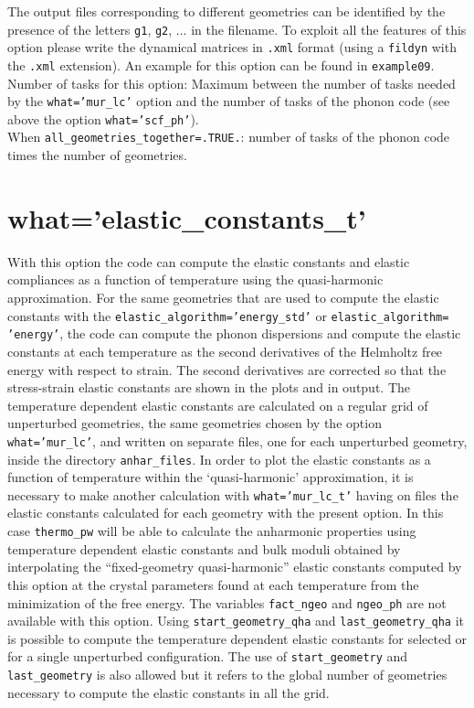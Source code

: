 \documentclass[12pt,a4paper,twoside]{report}
\begin{document}
The output files corresponding to different geometries can be identified
by the presence of the letters \texttt{g1}, \texttt{g2}, ... in the filename.
To exploit all the features of this option please write the dynamical matrices
in \texttt{.xml} format (using a \texttt{fildyn} with the \texttt{.xml}
extension).
An example for this option can be found in \texttt{example09}. \\
Number of tasks for this option: Maximum between the number of tasks  
needed by the \texttt{what='mur\_lc'} option and the number
of tasks of the phonon code (see above the option \texttt{what='scf\_ph'}). \\
When \texttt{all\_geometries\_together=.TRUE.}: number of tasks of the
phonon code times the number of geometries. \\

\newpage
{\color{coral}\section{what='elastic\_constants\_t'}}
\color{black}

With this option the code can compute the elastic constants and elastic
compliances as a function of temperature using the quasi-harmonic
approximation. For the same geometries that are used to compute the
elastic constants with the \texttt{elastic\_algorithm='energy\_std'} or
\texttt{elastic\_algorithm=}
\texttt{'energy'}, the code can compute the phonon 
dispersions and compute the elastic constants at each temperature 
as the second derivatives of the Helmholtz free energy 
with respect to strain. The second derivatives are corrected so that
the stress-strain elastic constants are shown in the plots and in output. 
The temperature dependent elastic constants are calculated on a regular 
grid of unperturbed geometries, the same geometries chosen by the option
\texttt{what='mur\_lc'}, and written on separate files, one for
each unperturbed geometry, inside the directory \texttt{anhar\_files}.
In order to plot the elastic constants as a function of temperature 
within the `quasi-harmonic' approximation,
it is necessary to make another calculation with \texttt{what='mur\_lc\_t'} 
having on files the elastic constants calculated for each geometry 
with the present option. 
In this case \texttt{thermo\_pw} will be able to calculate the anharmonic 
properties using temperature dependent elastic constants and bulk moduli 
obtained by interpolating the ``fixed-geometry quasi-harmonic'' elastic 
constants computed by this option at the crystal parameters found at 
each temperature from the minimization of the free energy. 
The variables \texttt{fact\_ngeo} and \texttt{ngeo\_ph} are not 
available with this option. 
Using \texttt{start\_geometry\_qha} and \texttt{last\_geometry\_qha} it is
possible to compute the temperature dependent elastic constants for
selected or for a single unperturbed configuration. 
The use of \texttt{start\_geometry} and \texttt{last\_geometry} is
also allowed but it refers to the global number of geometries necessary 
to compute the elastic constants in all the grid. 
\end{document}
